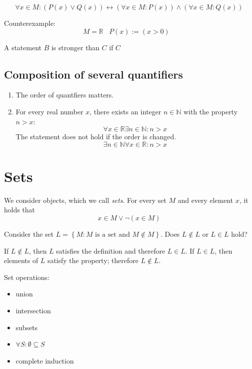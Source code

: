 \documentclass[a4paper,landscape,twocolumn]{article}
\theoremstyle{definition}
\newcommand\set[1]{\left\{#1\right\}}
\begin{document}
\[ \forall x \in M: (P(x) \lor Q(x)) \leftrightarrow (\forall x \in M: P(x)) \land (\forall x \in M: Q(x)) \]

Counterexample:
\[ M = \mathbb{R} \hspace{10pt} P(x) := ( x > 0 ) \hspace{10pt} \]

A statement $B$ is stronger than $C$ if $C$

\subsection{Composition of several quantifiers}
%
\begin{enumerate}
  \item The order of quantfiers matters.
  \item
    For every real number $x$, there exists an integer $n \in \mathbb{N}$ with the property $n > x$:
    \[ \forall x \in \mathbb{R} \exists n \in \mathbb{N}: n > x \]
    The statement does not hold if the order is changed.
    \[ \exists n \in \mathbb{N} \forall x \in \mathbb{R}: n > x \]
\end{enumerate}

\section{Sets}
%
We consider objects, which we call \emph{sets}.
For every set $M$ and every element $x$, it holds that
\[ x \in M \lor \neg(x \in M) \]

Consider the set $L = \set{M: M \text{ is a set and } M \not\in M}$.
Does $L \not\in L$ or $L \in L$ hold?

If $L \not\in L$, then $L$ satisfies the definition and therefore $L \in L$.
If $L \in L$, then elements of $L$ satisfy the property; therefore $L \not\in L$.

Set operations:
\begin{itemize}
  \item union
  \item intersection
  \item subsets
  \item $\forall S: \emptyset \subseteq S$
  \item complete induction
\end{itemize}
\end{document}

